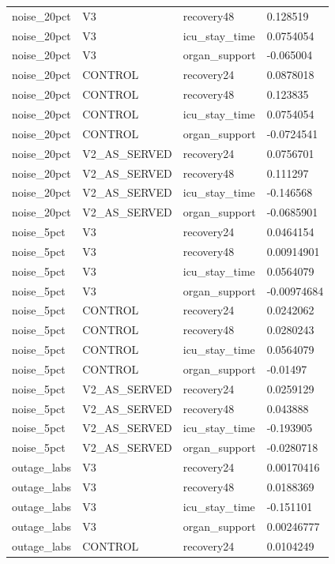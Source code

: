 \begin{tabular}{llll}
noise\_20pct & V3 & recovery48 & 0.128519 \\
noise\_20pct & V3 & icu\_stay\_time & 0.0754054 \\
noise\_20pct & V3 & organ\_support & -0.065004 \\
noise\_20pct & CONTROL & recovery24 & 0.0878018 \\
noise\_20pct & CONTROL & recovery48 & 0.123835 \\
noise\_20pct & CONTROL & icu\_stay\_time & 0.0754054 \\
noise\_20pct & CONTROL & organ\_support & -0.0724541 \\
noise\_20pct & V2\_AS\_SERVED & recovery24 & 0.0756701 \\
noise\_20pct & V2\_AS\_SERVED & recovery48 & 0.111297 \\
noise\_20pct & V2\_AS\_SERVED & icu\_stay\_time & -0.146568 \\
noise\_20pct & V2\_AS\_SERVED & organ\_support & -0.0685901 \\
noise\_5pct & V3 & recovery24 & 0.0464154 \\
noise\_5pct & V3 & recovery48 & 0.00914901 \\
noise\_5pct & V3 & icu\_stay\_time & 0.0564079 \\
noise\_5pct & V3 & organ\_support & -0.00974684 \\
noise\_5pct & CONTROL & recovery24 & 0.0242062 \\
noise\_5pct & CONTROL & recovery48 & 0.0280243 \\
noise\_5pct & CONTROL & icu\_stay\_time & 0.0564079 \\
noise\_5pct & CONTROL & organ\_support & -0.01497 \\
noise\_5pct & V2\_AS\_SERVED & recovery24 & 0.0259129 \\
noise\_5pct & V2\_AS\_SERVED & recovery48 & 0.043888 \\
noise\_5pct & V2\_AS\_SERVED & icu\_stay\_time & -0.193905 \\
noise\_5pct & V2\_AS\_SERVED & organ\_support & -0.0280718 \\
outage\_labs & V3 & recovery24 & 0.00170416 \\
outage\_labs & V3 & recovery48 & 0.0188369 \\
outage\_labs & V3 & icu\_stay\_time & -0.151101 \\
outage\_labs & V3 & organ\_support & 0.00246777 \\
outage\_labs & CONTROL & recovery24 & 0.0104249 \\

\end{tabular}
